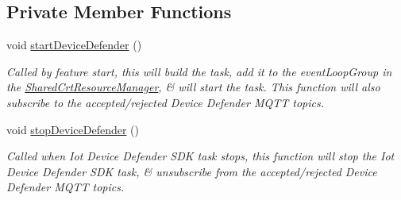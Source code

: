 \subsection*{Private Member Functions}
\begin{DoxyCompactItemize}
\item 
\mbox{\label{class_aws_1_1_iot_1_1_device_client_1_1_device_defender_1_1_device_defender_feature_a0d3be7affd06c7e2527f382a18a41faf}} 
void \hyperlink{class_aws_1_1_iot_1_1_device_client_1_1_device_defender_1_1_device_defender_feature_a0d3be7affd06c7e2527f382a18a41faf}{start\+Device\+Defender} ()
\begin{DoxyCompactList}\small\item\em Called by feature start, this will build the task, add it to the event\+Loop\+Group in the \hyperlink{class_aws_1_1_iot_1_1_device_client_1_1_shared_crt_resource_manager}{Shared\+Crt\+Resource\+Manager}, \& will start the task. This function will also subscribe to the accepted/rejected Device Defender M\+Q\+TT topics. \end{DoxyCompactList}\item 
\mbox{\label{class_aws_1_1_iot_1_1_device_client_1_1_device_defender_1_1_device_defender_feature_ad6b99bdbb2c41252cdfb9c8ae6315bb7}} 
void \hyperlink{class_aws_1_1_iot_1_1_device_client_1_1_device_defender_1_1_device_defender_feature_ad6b99bdbb2c41252cdfb9c8ae6315bb7}{stop\+Device\+Defender} ()
\begin{DoxyCompactList}\small\item\em Called when Iot Device Defender S\+DK task stops, this function will stop the Iot Device Defender S\+DK task, \& unsubscribe from the accepted/rejected Device Defender M\+Q\+TT topics. \end{DoxyCompactList}\end{DoxyCompactItemize}
